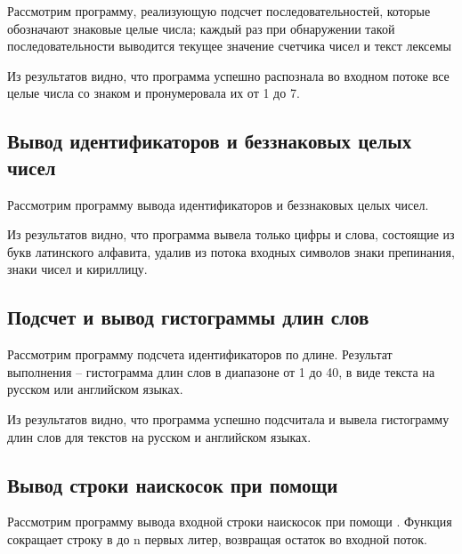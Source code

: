 Рассмотрим программу, реализующую подсчет последовательностей, которые обозначают знаковые целые числа; каждый раз при обнаружении такой последовательности выводится текущее значение счетчика чисел и текст лексемы



Из результатов видно, что программа успешно распознала во входном потоке все целые числа со знаком и пронумеровала их от 1 до 7.

\subsection{Вывод идентификаторов и беззнаковых целых чисел}

Рассмотрим программу вывода идентификаторов и беззнаковых целых чисел.



Из результатов видно, что программа вывела только цифры и слова, состоящие из букв латинского алфавита, удалив из потока входных символов знаки препинания, знаки чисел и кириллицу. 

\subsection{Подсчет и вывод гистограммы длин слов}

Рассмотрим программу подсчета идентификаторов по длине. Результат выполнения -- гистограмма длин слов в диапазоне от 1 до 40, в виде текста на русском или английском языках.
 



Из результатов видно, что программа успешно подсчитала и вывела гистограмму длин слов для текстов на русском и английском языках.

\subsection{Вывод строки наискосок при помощи }

Рассмотрим программу вывода входной строки наискосок при помощи . Функция  сокращает строку в  до n первых литер, возвращая остаток во входной
поток.




